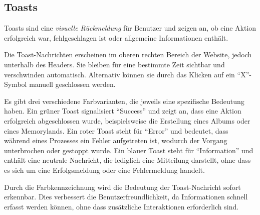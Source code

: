 \subsection{Toasts}

Toasts sind eine \emph{visuelle Rückmeldung} für Benutzer und zeigen an, ob eine Aktion 
erfolgreich war, fehlgeschlagen ist oder allgemeine Informationen enthält.  

Die Toast-Nachrichten erscheinen im oberen rechten Bereich der Website, jedoch 
unterhalb des Headers. Sie bleiben für eine bestimmte Zeit sichtbar und verschwinden 
automatisch. Alternativ können sie durch das Klicken auf ein ``X''-Symbol manuell 
geschlossen werden.  

Es gibt drei verschiedene Farbvarianten, die jeweils eine spezifische Bedeutung 
haben. Ein grüner Toast signalisiert ``Success'' und zeigt an, dass eine Aktion 
erfolgreich abgeschlossen wurde, beispielsweise die Erstellung eines Albums oder 
eines Memorylands. Ein roter Toast steht für ``Error'' und bedeutet, dass während 
eines Prozesses ein Fehler aufgetreten ist, wodurch der Vorgang unterbrochen oder 
gestoppt wurde. Ein blauer Toast steht für ``Information'' und enthält eine neutrale 
Nachricht, die lediglich eine Mitteilung darstellt, ohne dass es sich um eine 
Erfolgsmeldung oder eine Fehlermeldung handelt.

Durch die Farbkennzeichnung wird die Bedeutung der Toast-Nachricht sofort erkennbar. 
Dies verbessert die Benutzerfreundlichkeit, da Informationen schnell erfasst werden 
können, ohne dass zusätzliche Interaktionen erforderlich sind.







